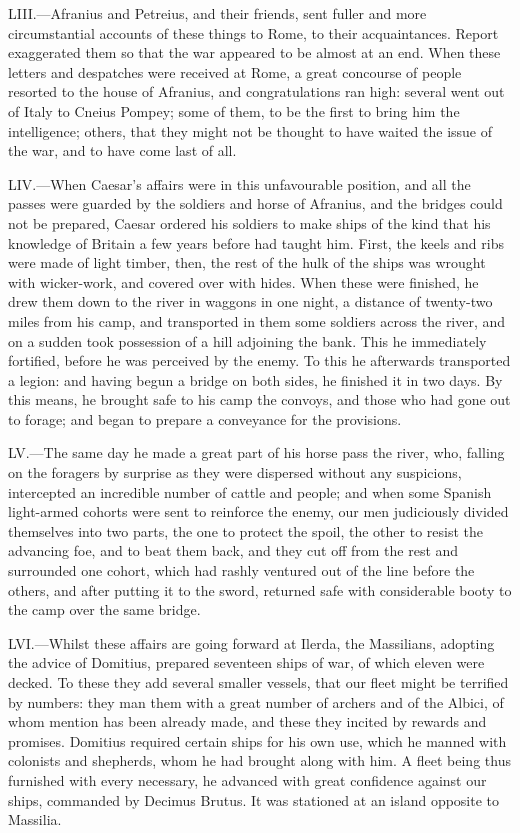 LIII.—Afranius and Petreius, and their friends, sent fuller and more
circumstantial accounts of these things to Rome, to their acquaintances.
Report exaggerated them so that the war appeared to be almost at an end.
When these letters and despatches were received at Rome, a great
concourse of people resorted to the house of Afranius, and
congratulations ran high: several went out of Italy to Cneius Pompey;
some of them, to be the first to bring him the intelligence; others,
that they might not be thought to have waited the issue of the war, and
to have come last of all.

LIV.—When Caesar's affairs were in this unfavourable position, and all
the passes were guarded by the soldiers and horse of Afranius, and the
bridges could not be prepared, Caesar ordered his soldiers to make ships
of the kind that his knowledge of Britain a few years before had taught
him. First, the keels and ribs were made of light timber, then, the rest
of the hulk of the ships was wrought with wicker-work, and covered over
with hides. When these were finished, he drew them down to the river in
waggons in one night, a distance of twenty-two miles from his camp, and
transported in them some soldiers across the river, and on a sudden took
possession of a hill adjoining the bank. This he immediately fortified,
before he was perceived by the enemy. To this he afterwards transported
a legion: and having begun a bridge on both sides, he finished it in two
days. By this means, he brought safe to his camp the convoys, and those
who had gone out to forage; and began to prepare a conveyance for the
provisions.

LV.—The same day he made a great part of his horse pass the river, who,
falling on the foragers by surprise as they were dispersed without any
suspicions, intercepted an incredible number of cattle and people; and
when some Spanish light-armed cohorts were sent to reinforce the enemy,
our men judiciously divided themselves into two parts, the one to
protect the spoil, the other to resist the advancing foe, and to beat
them back, and they cut off from the rest and surrounded one cohort,
which had rashly ventured out of the line before the others, and after
putting it to the sword, returned safe with considerable booty to the
camp over the same bridge.

LVI.—Whilst these affairs are going forward at Ilerda, the Massilians,
adopting the advice of Domitius, prepared seventeen ships of war, of
which eleven were decked. To these they add several smaller vessels,
that our fleet might be terrified by numbers: they man them with a great
number of archers and of the Albici, of whom mention has been already
made, and these they incited by rewards and promises. Domitius required
certain ships for his own use, which he manned with colonists and
shepherds, whom he had brought along with him. A fleet being thus
furnished with every necessary, he advanced with great confidence
against our ships, commanded by Decimus Brutus. It was stationed at an
island opposite to Massilia.

